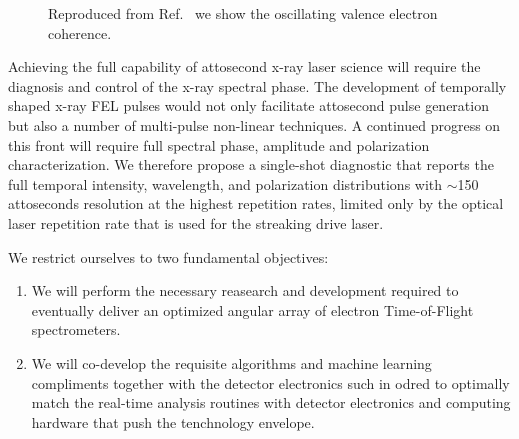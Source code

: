 \begin{wrapfigure}[14]{l}{.5\linewidth}
\caption{\label{fig::cederbaum}Reproduced from Ref.~\cite{Cederbaum2008} we show the oscillating valence electron coherence.}
\end{wrapfigure}

Achieving the full capability of attosecond x-ray laser science will require the diagnosis and control of the x-ray spectral phase.
The development of temporally shaped x-ray FEL pulses would not only facilitate attosecond pulse generation but also a number of multi-pulse non-linear techniques.
A continued progress on this front \cite{Lutman13_twocolor,Marinelli13_twocolor,Allaria2014,Marinelli2015,Prince2016,Lutman2016,Marinelli2016} will require full spectral phase, amplitude and polarization characterization. 
We therefore propose a single-shot diagnostic that reports the full temporal intensity, wavelength, and polarization distributions with $\sim$150 attoseconds resolution at the highest repetition rates, limited only by the optical laser repetition rate that is used for the streaking drive laser.


We restrict ourselves to two fundamental objectives:
\begin{enumerate}
\item \label{obj::detector} We will perform the necessary reasearch and development required to eventually deliver an optimized angular array of electron Time-of-Flight spectrometers.
\item \label{obj::analysis} We will co-develop the requisite algorithms and machine learning compliments together with the detector electronics such in odred to optimally match the real-time analysis routines with detector electronics and computing hardware that push the tenchnology envelope.
\end{enumerate}

